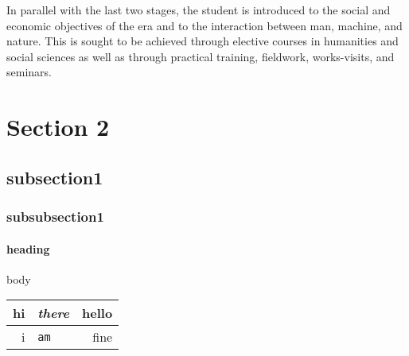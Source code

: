 \documentclass{article}[12pt]
\begin{document}
	In parallel with the last two stages, the student is introduced to the social and economic objectives of the era and to the interaction between man, machine, and nature. This is sought to be achieved through elective courses in humanities and social sciences as well as through practical training, fieldwork, works-visits, and seminars. 
	
\section{Section 2}
\subsection{subsection1}
\subsubsection{subsubsection1}
\paragraph{heading}{body}

\begin{tabular}{|r|l|r|}
	\hline
	
	\textbf{hi} & \textit{there} & \textrm{hello} \\
	\hline
	\hline
	i & \texttt{am} & \textsf{fine} \\
	\hline
\end{tabular}



	
	
	
\end{document}
